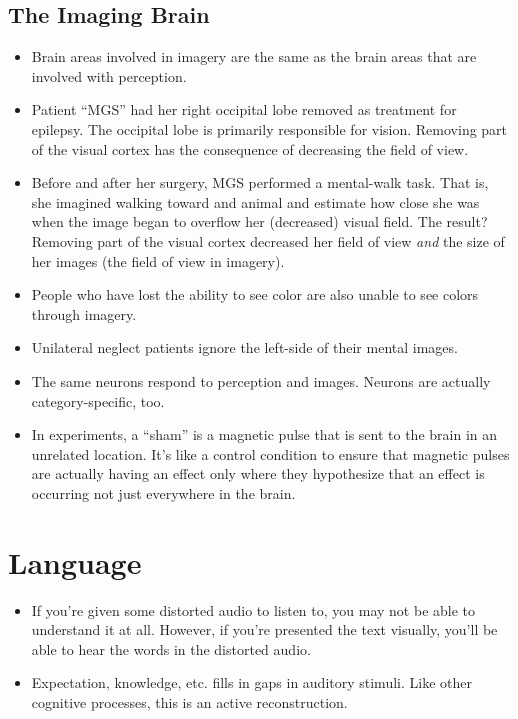 \documentclass[]{article}
\newcommand{\lecture}[1]{\marginpar{{\footnotesize $\leftarrow$ \underline{#1}}}}
\begin{document}
		\subsection{The Imaging Brain}
			\begin{itemize}
				\item Brain areas involved in imagery are the same as the brain areas that are involved with perception.
				\item Patient ``MGS'' had her right occipital lobe removed as treatment for epilepsy. The occipital lobe is primarily responsible for vision. Removing part of the visual cortex has the consequence of decreasing the field of view.
				\item Before and after her surgery, MGS performed a mental-walk task. That is, she imagined walking toward and animal and estimate how close she was when the image began to overflow her (decreased) visual field. The result? Removing part of the visual cortex decreased her field of view \emph{and} the size of her images (the field of view in imagery).
				\item People who have lost the ability to see color are also unable to see colors through imagery.
				\item Unilateral neglect patients ignore the left-side of their mental images.
				\item The same neurons respond to perception and images. Neurons are actually category-specific, too.
				\item In experiments, a ``sham'' is a magnetic pulse that is sent to the brain in an unrelated location. It's like a control condition to ensure that magnetic pulses are actually having an effect only where they hypothesize that an effect is occurring \textendash{} not just everywhere in the brain.
			\end{itemize}
	
	\section{Language} \lecture{March 12, 2013}
		\begin{itemize}
			\item If you're given some distorted audio to listen to, you may not be able to understand it at all. However, if you're presented the text visually, you'll be able to hear the words in the distorted audio.
			\item Expectation, knowledge, etc. fills in gaps in auditory stimuli. Like other cognitive processes, this is an active reconstruction.
		\end{itemize}
\end{document}

